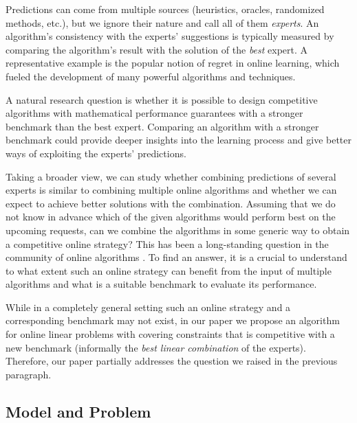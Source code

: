 Predictions can come from multiple sources (heuristics, oracles, randomized methods, etc.), but we ignore their nature and call all of them \emph{experts}.  An algorithm's consistency with the experts' suggestions is typically measured by comparing the algorithm's result with the solution of the \emph{best} expert. A representative example is the popular notion of regret in online learning, which fueled the development of many powerful algorithms and techniques.

A natural research question is whether it is possible to design competitive algorithms with mathematical performance guarantees with a stronger benchmark than the best expert. Comparing an algorithm with a stronger benchmark could provide deeper insights into the learning process and give better ways of exploiting the experts' predictions.

Taking a broader view, we can study whether combining predictions of several experts is similar to combining multiple online algorithms and whether we can expect to achieve better solutions with the combination. Assuming that we do not know in advance which of the given algorithms would perform best on the upcoming requests, can we combine the algorithms in some generic way to obtain a competitive online strategy? This has been a long-standing question in the community of online algorithms \cite{AzarBroder93:On-line-Choice,BlumBurch00:On-line-Learning}. To find an answer, it is a crucial to understand to what extent such an online strategy can benefit from the input of multiple algorithms and what is a suitable benchmark to evaluate its performance.

While in a completely general setting such an online strategy and a corresponding benchmark may not exist, in our paper we propose
an algorithm for online linear problems with covering constraints that is competitive with a new benchmark (informally the \emph{best linear combination} of the experts). Therefore, our paper partially addresses the question we raised in the previous paragraph.

\subsection{Model and Problem}

